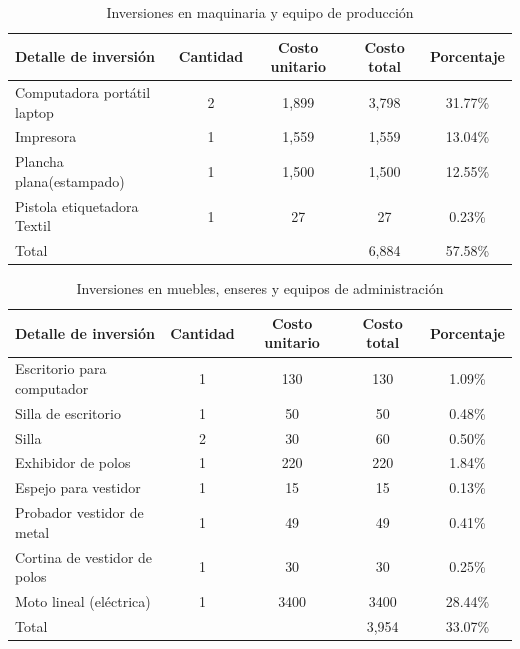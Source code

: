 \documentclass[a4paper,openright,12pt]{book}
\begin{document}
\begin{table}[H]
\centering
\begin{tabular}{lcccc}
\hline
\textbf{Detalle de inversión}    & \textbf{Cantidad} & \textbf{Costo unitario} & \textbf{Costo total} & \textbf{Porcentaje} \\
\hline %
Computadora portátil laptop      &     2             &     1,899               &              3,798   & 31.77\% \\
Impresora                        &     1             &     1,559               &              1,559   & 13.04\% \\
Plancha plana(estampado)         &     1             &     1,500               &              1,500   & 12.55\% \\
Pistola etiquetadora Textil      &     1             &     27                  &              27      & 0.23\%  \\
Total                            &                   &	                       &             6,884    & 57.58\% \\
\hline
\end{tabular}
\caption{Inversiones en maquinaria y equipo de producción}
\label{Tabla3}
\end{table}

\begin{table}[H]
\centering
\begin{tabular}{lcccc}
\hline
\textbf{Detalle de inversión}    & \textbf{Cantidad} & \textbf{Costo unitario} & \textbf{Costo total} & \textbf{Porcentaje} \\
\hline %
Escritorio para computador       &     1             &     130                 &              130     & 1.09\% \\
Silla de escritorio              &     1             &     50                  &              50      & 0.48\% \\
Silla                            &     2             &     30                  &              60      & 0.50\% \\
Exhibidor de polos               &     1             &     220                 &              220     & 1.84\%  \\
Espejo para vestidor             &     1             &     15                  &              15      & 0.13\%  \\
Probador vestidor de metal       &     1             &     49                  &              49      & 0.41\%  \\
Cortina de vestidor de polos     &     1             &     30                  &              30      & 0.25\%  \\
Moto lineal (eléctrica)          &     1             &     3400                &              3400    & 28.44\%  \\
Total                            &                   &	                       &             3,954    & 33.07\% \\
\hline
\end{tabular}
\caption{Inversiones en muebles, enseres y equipos de administración}
\label{Tabla4}
\end{table}
\end{document}
